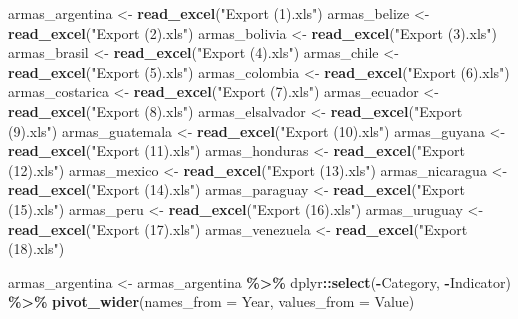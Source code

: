 \documentclass[
  11pt,
]{article}
\newenvironment{Shaded}{\begin{snugshade}}{\end{snugshade}}
\newcommand{\AttributeTok}[1]{\textcolor[rgb]{0.13,0.29,0.53}{#1}}
\newcommand{\FunctionTok}[1]{\textcolor[rgb]{0.13,0.29,0.53}{\textbf{#1}}}
\newcommand{\NormalTok}[1]{#1}
\newcommand{\OtherTok}[1]{\textcolor[rgb]{0.56,0.35,0.01}{#1}}
\newcommand{\SpecialCharTok}[1]{\textcolor[rgb]{0.81,0.36,0.00}{\textbf{#1}}}
\newcommand{\StringTok}[1]{\textcolor[rgb]{0.31,0.60,0.02}{#1}}
\begin{document}
\begin{Shaded}
\begin{Highlighting}[]
\NormalTok{armas\_argentina }\OtherTok{\textless{}{-}} \FunctionTok{read\_excel}\NormalTok{(}\StringTok{"Export (1).xls"}\NormalTok{)}
\NormalTok{armas\_belize }\OtherTok{\textless{}{-}} \FunctionTok{read\_excel}\NormalTok{(}\StringTok{"Export (2).xls"}\NormalTok{)}
\NormalTok{armas\_bolivia }\OtherTok{\textless{}{-}} \FunctionTok{read\_excel}\NormalTok{(}\StringTok{"Export (3).xls"}\NormalTok{)}
\NormalTok{armas\_brasil }\OtherTok{\textless{}{-}} \FunctionTok{read\_excel}\NormalTok{(}\StringTok{"Export (4).xls"}\NormalTok{)}
\NormalTok{armas\_chile }\OtherTok{\textless{}{-}} \FunctionTok{read\_excel}\NormalTok{(}\StringTok{"Export (5).xls"}\NormalTok{)}
\NormalTok{armas\_colombia }\OtherTok{\textless{}{-}} \FunctionTok{read\_excel}\NormalTok{(}\StringTok{"Export (6).xls"}\NormalTok{)}
\NormalTok{armas\_costarica }\OtherTok{\textless{}{-}} \FunctionTok{read\_excel}\NormalTok{(}\StringTok{"Export (7).xls"}\NormalTok{)}
\NormalTok{armas\_ecuador }\OtherTok{\textless{}{-}} \FunctionTok{read\_excel}\NormalTok{(}\StringTok{"Export (8).xls"}\NormalTok{)}
\NormalTok{armas\_elsalvador }\OtherTok{\textless{}{-}} \FunctionTok{read\_excel}\NormalTok{(}\StringTok{"Export (9).xls"}\NormalTok{)}
\NormalTok{armas\_guatemala }\OtherTok{\textless{}{-}} \FunctionTok{read\_excel}\NormalTok{(}\StringTok{"Export (10).xls"}\NormalTok{)}
\NormalTok{armas\_guyana }\OtherTok{\textless{}{-}} \FunctionTok{read\_excel}\NormalTok{(}\StringTok{"Export (11).xls"}\NormalTok{)}
\NormalTok{armas\_honduras }\OtherTok{\textless{}{-}} \FunctionTok{read\_excel}\NormalTok{(}\StringTok{"Export (12).xls"}\NormalTok{)}
\NormalTok{armas\_mexico }\OtherTok{\textless{}{-}} \FunctionTok{read\_excel}\NormalTok{(}\StringTok{"Export (13).xls"}\NormalTok{)}
\NormalTok{armas\_nicaragua }\OtherTok{\textless{}{-}} \FunctionTok{read\_excel}\NormalTok{(}\StringTok{"Export (14).xls"}\NormalTok{)}
\NormalTok{armas\_paraguay }\OtherTok{\textless{}{-}} \FunctionTok{read\_excel}\NormalTok{(}\StringTok{"Export (15).xls"}\NormalTok{)}
\NormalTok{armas\_peru }\OtherTok{\textless{}{-}} \FunctionTok{read\_excel}\NormalTok{(}\StringTok{"Export (16).xls"}\NormalTok{)}
\NormalTok{armas\_uruguay }\OtherTok{\textless{}{-}} \FunctionTok{read\_excel}\NormalTok{(}\StringTok{"Export (17).xls"}\NormalTok{)}
\NormalTok{armas\_venezuela }\OtherTok{\textless{}{-}} \FunctionTok{read\_excel}\NormalTok{(}\StringTok{"Export (18).xls"}\NormalTok{)}

\NormalTok{armas\_argentina }\OtherTok{\textless{}{-}}\NormalTok{ armas\_argentina }\SpecialCharTok{\%\textgreater{}\%}
\NormalTok{  dplyr}\SpecialCharTok{::}\FunctionTok{select}\NormalTok{(}\SpecialCharTok{{-}}\NormalTok{Category, }\SpecialCharTok{{-}}\NormalTok{Indicator) }\SpecialCharTok{\%\textgreater{}\%}
  \FunctionTok{pivot\_wider}\NormalTok{(}\AttributeTok{names\_from =}\NormalTok{ Year, }\AttributeTok{values\_from =}\NormalTok{ Value)}


\end{Highlighting}
\end{Shaded}
\end{document}
